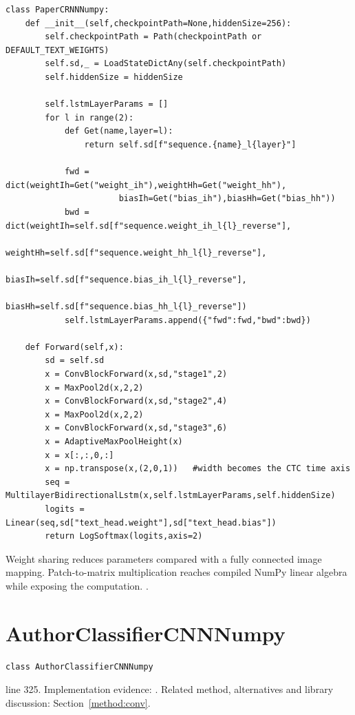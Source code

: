 \begin{lstlisting}[style=plain]
class PaperCRNNNumpy:
    def __init__(self,checkpointPath=None,hiddenSize=256):
        self.checkpointPath = Path(checkpointPath or DEFAULT_TEXT_WEIGHTS)
        self.sd,_ = LoadStateDictAny(self.checkpointPath)
        self.hiddenSize = hiddenSize

        self.lstmLayerParams = []
        for l in range(2):
            def Get(name,layer=l):
                return self.sd[f"sequence.{name}_l{layer}"]

            fwd = dict(weightIh=Get("weight_ih"),weightHh=Get("weight_hh"),
                       biasIh=Get("bias_ih"),biasHh=Get("bias_hh"))
            bwd = dict(weightIh=self.sd[f"sequence.weight_ih_l{l}_reverse"],
                       weightHh=self.sd[f"sequence.weight_hh_l{l}_reverse"],
                       biasIh=self.sd[f"sequence.bias_ih_l{l}_reverse"],
                       biasHh=self.sd[f"sequence.bias_hh_l{l}_reverse"])
            self.lstmLayerParams.append({"fwd":fwd,"bwd":bwd})

    def Forward(self,x):
        sd = self.sd
        x = ConvBlockForward(x,sd,"stage1",2)
        x = MaxPool2d(x,2,2)
        x = ConvBlockForward(x,sd,"stage2",4)
        x = MaxPool2d(x,2,2)
        x = ConvBlockForward(x,sd,"stage3",6)
        x = AdaptiveMaxPoolHeight(x)
        x = x[:,:,0,:]
        x = np.transpose(x,(2,0,1))   #width becomes the CTC time axis
        seq = MultilayerBidirectionalLstm(x,self.lstmLayerParams,self.hiddenSize)
        logits = Linear(seq,sd["text_head.weight"],sd["text_head.bias"])
        return LogSoftmax(logits,axis=2)
\end{lstlisting}
Weight sharing reduces parameters compared with a fully connected image mapping. Patch-to-matrix multiplication reaches compiled NumPy linear algebra while exposing the computation. \cite{shi2017,torchconv,numpystride,numpymatmul}.


\section{AuthorClassifierCNNNumpy}\label{fn:recognise:AuthorClassifierCNNNumpy}
\begin{lstlisting}[style=sig]
class AuthorClassifierCNNNumpy
\end{lstlisting}
 line 325. Implementation evidence: \cite{code2026}. Related method, alternatives and library discussion: Section~\ref{method:conv}.


